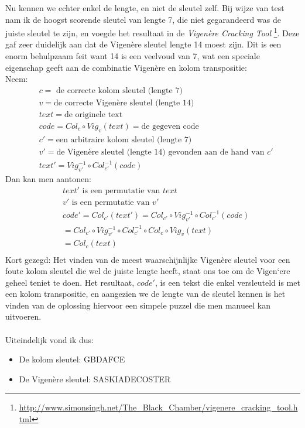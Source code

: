 \documentclass[fleqn]{article}
\begin{document}
	Nu kennen we echter enkel de lengte, en niet de sleutel zelf. Bij wijze van test nam ik de hoogst scorende sleutel van lengte 7, die niet gegarandeerd was de juiste sleutel te zijn, en voegde het resultaat in de \textit{Vigen\`ere Cracking Tool} \footnote{\url{http://www.simonsingh.net/The_Black_Chamber/vigenere_cracking_tool.html}}. Deze gaf zeer duidelijk aan dat de Vigen\`ere sleutel lengte 14 moest zijn. Dit is een enorm behulpzaam feit want 14 is een veelvoud van 7, wat een speciale eigenschap geeft aan de combinatie Vigen\`ere en kolom transpositie:\\
	Neem:
	\begin{equation}
	\begin{aligned}
		& c = \text{ de correcte kolom sleutel (lengte 7)}\\
		& v = \text{de correcte Vigen\`ere sleutel (lengte 14)}	\\
		& text = \text{de originele text}\\
		& code = Col_{c} \circ Vig_{v} (text) = \text{de gegeven code}\\
		& c' = \text{een arbitraire kolom sleutel (lengte 7)} \\
		& v' = \text{de Vigen\`ere sleutel (lengte 14) gevonden aan de hand van } c' \\
		& text' = Vig_{v'}^{-1} \circ Col_{c'}^{-1} (code)
	\end{aligned}
	\end{equation}	
	Dan kan men aantonen:
	\begin{equation}
	\begin{aligned}
		&text' \text{ is een permutatie van } text\\
		&v' \text{ is een permutatie van } v'\\
		&code' = Col_{c'}(text') = Col_{c'} \circ Vig_{v'}^{-1} \circ Col_{c'}^{-1} (code)\\
		& = Col_{c'} \circ Vig_{v'}^{-1} \circ Col_{c'}^{-1} \circ Col_{c} \circ Vig_{v} (text) \\
		& = Col_{c} (text)\\
	\end{aligned}
	\end{equation}	
	Kort gezegd: Het vinden van de meest waarschijnlijke Vigen\`ere sleutel voor een foute kolom sleutel die wel de juiste lengte heeft, staat ons toe om de Vigen`ere geheel teniet te doen. Het resultaat, $code'$, is een tekst die enkel versleuteld is met een kolom transpositie, en aangezien we de lengte van de sleutel kennen is het vinden van de oplossing hiervoor een simpele puzzel die men manueel kan uitvoeren.\\\\	
	Uiteindelijk vond ik dus:
	\begin{itemize}
		\setlength\itemsep{0pt}
		\item De kolom sleutel: GBDAFCE
		\item De Vigen\`ere sleutel: SASKIADECOSTER
	\end{itemize}
	
\end{document}
